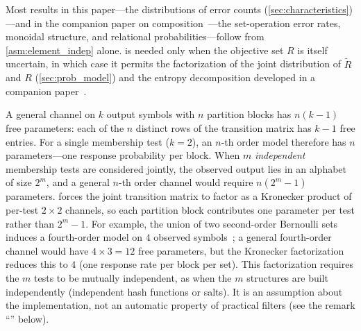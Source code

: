 \begin{remark}
\label{rem:axiom_economy}
Most results in this paper---the distributions of error counts (\cref{sec:characteristics})---and in the companion paper on composition~\cite{bernoulliComposition}---the set-operation error rates, monoidal structure, and relational probabilities---follow from \cref{asm:element_indep} alone.
 is needed only when the objective set $R$ is itself uncertain, in which case it permits the factorization of the joint distribution of $\tilde{R}$ and $R$ (\cref{sec:prob_model}) and the entropy decomposition developed in a companion paper~\cite{bernoulliEntropy}.
\end{remark}

\begin{remark}
\label{rem:parametric_parsimony}
A general channel on $k$ output symbols with $n$ partition blocks has $n(k-1)$ free parameters: each of the $n$ distinct rows of the transition matrix has $k - 1$ free entries.
For a single membership test ($k = 2$), an $n$-th order model therefore has $n$ parameters---one response probability per block.
When $m$ \emph{independent} membership tests are considered jointly, the observed output lies in an alphabet of size $2^m$, and a general $n$-th order channel would require $n(2^m - 1)$ parameters.
 forces the joint transition matrix to factor as a Kronecker product of per-test $2 \times 2$ channels, so each partition block contributes one parameter per test rather than $2^m - 1$.
For example, the union of two second-order Bernoulli sets induces a fourth-order model on $4$ observed symbols~\cite{bernoulliComposition}; a general fourth-order channel would have $4 \times 3 = 12$ free parameters, but the Kronecker factorization reduces this to $4$ (one response rate per block per set).
This factorization requires the $m$ tests to be mutually independent, as when the $m$ structures are built independently (independent hash functions or salts).
It is an assumption about the implementation, not an automatic property of practical filters (see the remark ``'' below).
\end{remark}

